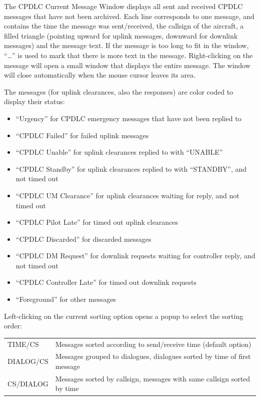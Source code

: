 \documentclass[11pt,a4paper,oldfontcommands]{memoir}
\begin{document}
The CPDLC Current Message Window displays all sent and received CPDLC messages that have not been archived. Each line corresponds to one message, and contains the time the message was sent/received, the callsign of the aircraft, a filled triangle (pointing upward for uplink messages, downward for downlink messages) and the message text. If the message is too long to fit in the window, “…” is used to mark that there is more text in the message. Right-clicking on the message will open a small window that displays the entire message. The window will close automatically when the mouse cursor leaves its area.

The messages (for uplink clearances, also the responses) are color coded to display their status:

\begin{itemize}
    \item “Urgency” for CPDLC emergency messages that have not been replied to
    \item “CPDLC Failed” for failed uplink messages
    \item “CPDLC Unable” for uplink clearances replied to with “UNABLE”
    \item “CPDLC Standby” for uplink clearances replied to with “STANDBY”, and not timed out
    \item “CPDLC UM Clearance” for uplink clearances waiting for reply, and not timed out
    \item “CPDLC Pilot Late” for timed out uplink clearances
    \item “CPDLC Discarded” for discarded messages
    \item “CPDLC DM Request” for downlink requests waiting for controller reply, and not timed out
    \item “CPDLC Controller Late” for timed out downlink requests
    \item “Foreground” for other messages
\end{itemize}

Left-clicking on the current sorting option opens a popup to select the sorting order:

\begin{tabular}{l l}
    TIME/CS     & Messages sorted according to send/receive time (default option)\\
    DIALOG/CS   & Messages grouped to dialogues, dialogues sorted by time of first message\\
    CS/DIALOG   & Messages sorted by callsign, messages with same callsign sorted by time\\
\end{tabular}
\end{document}
